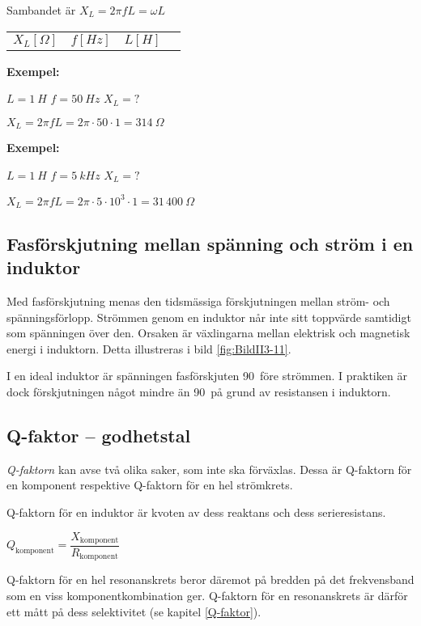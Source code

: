 Sambandet är
\(X_L = 2\pi fL = \omega L\)

\begin{tabular}{llll}
 \(X_L [\Omega]\) & \(f [Hz]\) & \(L [H]\)
\end{tabular}

\textbf{Exempel:}

\(L = 1\ H\) \(f = 50\ Hz\) \(X_L = ?\)

\(X_L = 2\pi fL = 2\pi  \cdot 50 \cdot 1 = 314\ \Omega\)

\textbf{Exempel:}

\(L = 1\ H\) \(f = 5\ kHz\) \(X_L = ?\)

\(X_L = 2\pi fL = 2\pi  \cdot 5 \cdot 10^3 \cdot 1 = 31\, 400\ \Omega\)

\subsection{Fasförskjutning mellan spänning och ström i en induktor}

Med fasförskjutning menas den tidsmässiga förskjutningen mellan ström- och
spänningsförlopp. Strömmen genom en induktor når inte sitt toppvärde samtidigt
som spänningen över den. Orsaken är växlingarna mellan elektrisk och magnetisk
energi i induktorn.
Detta illustreras i bild \ref{fig:BildII3-11}.

I en ideal induktor är spänningen fasförskjuten 90\degree~före strömmen.
I praktiken är dock förskjutningen något mindre än 90\degree~på grund av
resistansen i induktorn.

\subsection{Q-faktor -- godhetstal}

\emph{Q-faktorn} kan avse två olika saker, som inte ska förväxlas.
Dessa är Q-faktorn för en komponent respektive Q-faktorn för en hel strömkrets.

Q-faktorn för en induktor är kvoten av dess reaktans och dess serieresistans.

\(Q_\text{komponent} = \dfrac{X_\text{komponent}}{R_\text{komponent}}\)

Q-faktorn för en hel resonanskrets beror däremot på bredden på det
frekvensband som en viss komponentkombination ger.
Q-faktorn för en resonanskrets är därför ett mått på dess
selektivitet (se kapitel \ref{Q-faktor}).

